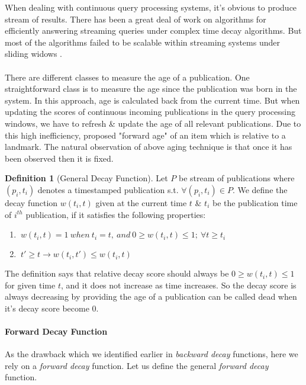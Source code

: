 \documentclass[a4paper,12pt,oneside]{book}
\theoremstyle{definition}
\newtheorem{definition}{Definition}[section]
\theoremstyle{remark}
\begin{document}
When dealing with continuous query processing systems, it's obvious to produce stream of results. There has been a great deal of work on algorithms for efficiently answering streaming queries under complex time decay algorithms. But most of the algorithms failed to be scalable within streaming systems under sliding widows \cite{Cormode2009}.

\paragraph*{}
There are different classes to measure the age of a publication. One straightforward class is to measure the age since the publication was born in the system. In this approach, age is calculated back from the current time. But when updating the scores of continuous incoming publications in the query processing windows, we have to refresh \& update the age of all relevant publications. Due to this high inefficiency, \cite{Cormode2009} proposed "forward age" of an item which is relative to a landmark. The natural observation of above aging technique is that once it has been observed then it is fixed. 

\begin{definition}[General Decay Function]
Let $P$ be stream of publications where $(p_i, t_i)$ denotes a timestamped publication s.t. $ \forall (p_i, t_i) \in P$. We define the decay function $w(t_i, t)$ given at the current time $t$ \& $t_i$ be the publication time of $i^{th}$ publication, if it satisfies the following properties:
\begin{enumerate}[label=(\roman*]
\item $ \ w(t_i, t)=1\ when\ t_i=t,\ and\ 0\geq w(t_i, t) \leq 1;\ \forall t\geq t_i $
\item $ \ t' \geq t \rightarrow w(t_i, t')\leq w(t_i, t) $
\end{enumerate}

The definition says that relative decay score should always be $ 0 \geq w(t_i, t) \leq 1 $ for given time $t$, and it does not increase as time increases. So the decay score is always decreasing by providing the age of a publication can be called dead when it's decay score become $0$.
\end{definition}

\paragraph*{Forward Decay Function}
As the drawback which we identified earlier in \emph{backward decay} functions, here we rely on a \emph{forward decay} function. Let us define the general \emph{forward decay} function.
\end{document}
